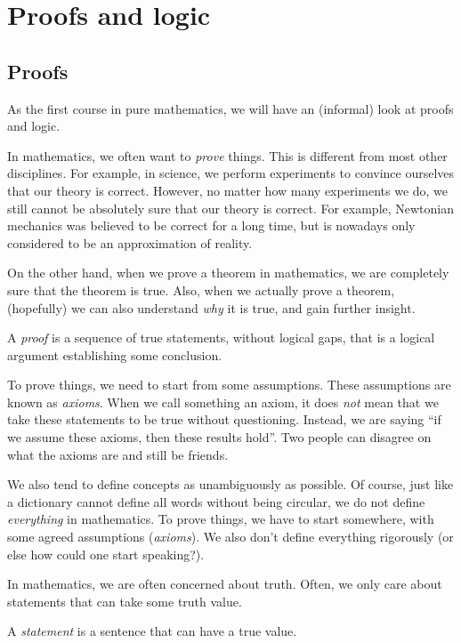 \documentclass[a4paper]{article}
\begin{document}
\section{Proofs and logic}
\subsection{Proofs}
As the first course in pure mathematics, we will have an (informal) look at proofs and logic.

In mathematics, we often want to \emph{prove} things. This is different from most other disciplines. For example, in science, we perform experiments to convince ourselves that our theory is correct. However, no matter how many experiments we do, we still cannot be absolutely sure that our theory is correct. For example, Newtonian mechanics was believed to be correct for a long time, but is nowadays only considered to be an approximation of reality.

On the other hand, when we prove a theorem in mathematics, we are completely sure that the theorem is true. Also, when we actually prove a theorem, (hopefully) we can also understand \emph{why} it is true, and gain further insight.

\begin{defi}[Proof]
  A \emph{proof} is a sequence of true statements, without logical gaps, that is a logical argument establishing some conclusion.
\end{defi}
To prove things, we need to start from some assumptions. These assumptions are known as \emph{axioms}. When we call something an axiom, it does \emph{not} mean that we take these statements to be true without questioning. Instead, we are saying ``if we assume these axioms, then these results hold''. Two people can disagree on what the axioms are and still be friends.

We also tend to define concepts as unambiguously as possible. Of course, just like a dictionary cannot define all words without being circular,  we do not define \emph{everything} in mathematics.
To prove things, we have to start somewhere, with some agreed assumptions (\emph{axioms}). We also don't define everything rigorously (or else how could one start speaking?).

In mathematics, we are often concerned about truth. Often, we only care about statements that can take some truth value.
\begin{defi}[Statement]
  A \emph{statement} is a sentence that can have a true value.
\end{defi}
\end{document}
